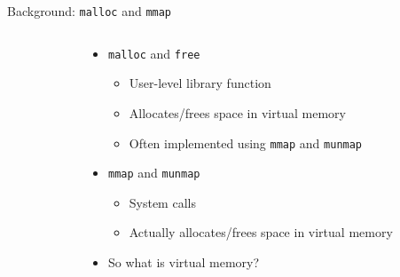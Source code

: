 \documentclass[aspectratio=169]{beamer}
\newcommand{\bi}{\begin{itemize}}
\newcommand{\ei}{\end{itemize}}
\begin{document}
\begin{frame}{Background: \texttt{malloc} and \texttt{mmap}}
\begin{columns}[T]
\begin{column}{0.2\textwidth}
    \end{column}
    \begin{column}{0.8\textwidth}
      \bi
    \item \texttt{malloc} and \texttt{free}
      \bi
    \item User-level library function
    \item Allocates/frees space in virtual memory
    \item Often implemented using \texttt{mmap} and \texttt{munmap}
      \ei
      \pause
    \item \texttt{mmap} and \texttt{munmap}
      \bi
    \item System calls
    \item Actually allocates/frees space in virtual memory
      \ei
      \pause
    \item So what is virtual memory?
      \ei
    \end{column}
  \end{columns}
\end{frame}
\end{document}
